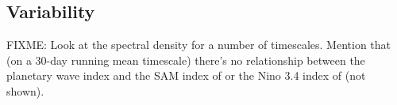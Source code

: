 \subsection{Variability}

FIXME: Look at the spectral density for a number of timescales. Mention that (on a 30-day running mean timescale) there's no relationship between the planetary wave index and the SAM index of \citet{Marshall2003} or the Nino 3.4 index of \citet{Trenberth2001} (not shown). 